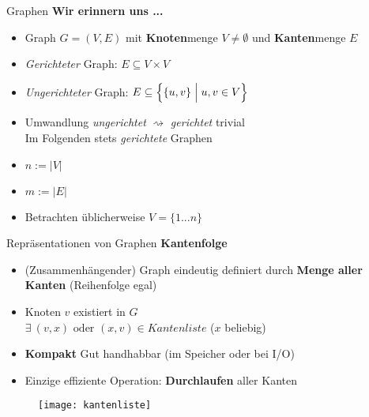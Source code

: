 

\begin{frame}{Graphen}
	\textbf{Wir erinnern uns ...} 
	\begin{itemize}
		\item Graph $G = (V, E)$ mit \textbf{Knoten}menge $V \neq \emptyset$ und \textbf{Kanten}menge $E$
		\pause
		\item \emph{Gerichteter} Graph: $E \subseteq V \times V$
		\item \emph{Ungerichteter} Graph: $E \subseteq \Big\lbrace \{u, v\} \Bigm| u, v \in V \Big\rbrace$
		\pause
		\item Umwandlung \textit{ungerichtet} $\rightsquigarrow$ \textit{gerichtet} trivial \\ 
		\impl Im Folgenden stets \emph{gerichtete} Graphen
		\pause
		\item $n := |V|$
		\item $m := |E|$
		\pause
		\item Betrachten üblicherweise $V = \{1...n\}$ 
	\end{itemize}
\end{frame}

\begin{frame}{Repräsentationen von Graphen}
	\textbf{Kantenfolge} \\[0,125cm]
	\begin{itemize}
		\item {\small (Zusammenhängender)} Graph eindeutig definiert durch \textbf{Menge aller Kanten} (Reihenfolge egal)
		\pause
		\item Knoten $v$ existiert in $G$ \\ 
		\gdw $\exists\ (v, x) \text{ oder } (x, v) \in \textit{Kantenliste}$ \quad ($x$ beliebig)
		\pause
		\item[\Pros] \textbf{Kompakt} \impl Gut handhabbar (im Speicher oder bei I/O)
		\pause
		\item[\Cons] Einzige effiziente Operation: \textbf{Durchlaufen} aller Kanten
	\end{itemize}
	\begin{figure}[htp]
		\centering
		\texttt{[image: kantenliste]}
	\end{figure}
\end{frame}

